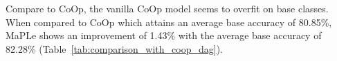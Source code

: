 \documentclass[10pt,twocolumn,letterpaper]{article}
\begin{document}
\begin{table}[!h]
\vspace{-0.1in}
    \centering
    \caption{ Generalization comparison of MaPLe with CoOp\dag.}
    \label{tab:comparison_with_coop_dag}
    \vspace{-0.15in}
\end{table}

Compare to CoOp, the vanilla CoOp model seems to overfit on base classes. When compared to CoOp which attains an average base accuracy of 80.85\%, MaPLe shows an improvement of 1.43\% with the average base accuracy of 82.28\% (Table~\ref{tab:comparison_with_coop_dag}).
 
\end{document}
